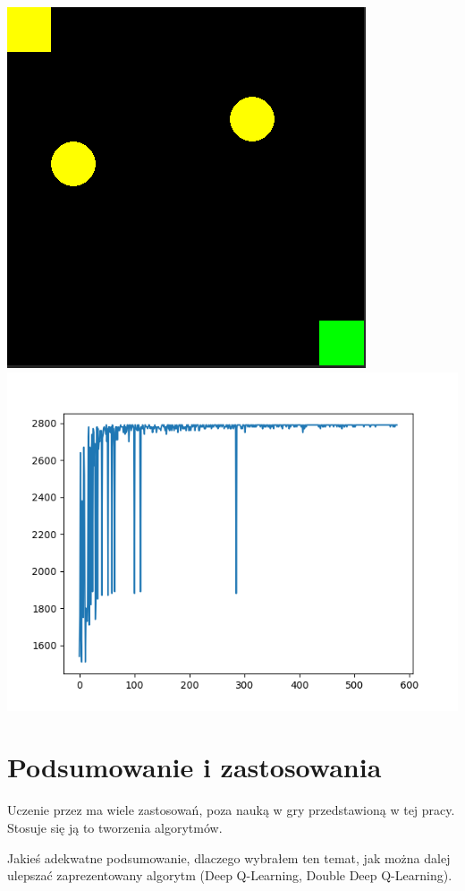 \documentclass[a4paper,12pt]{article}
\begin{document}
\includegraphics[scale=0.8]{testy/plansza1.png} \newline
\includegraphics[scale=0.8]{testy/wykres1.png}



\section{Podsumowanie i zastosowania}

Uczenie przez ma wiele zastosowań, poza nauką w gry przedstawioną w tej pracy. Stosuje się ją to tworzenia algorytmów.

 Jakieś adekwatne podsumowanie, dlaczego wybrałem ten temat, jak można dalej ulepszać zaprezentowany algorytm (Deep Q-Learning, Double Deep Q-Learning).
\end{document}
